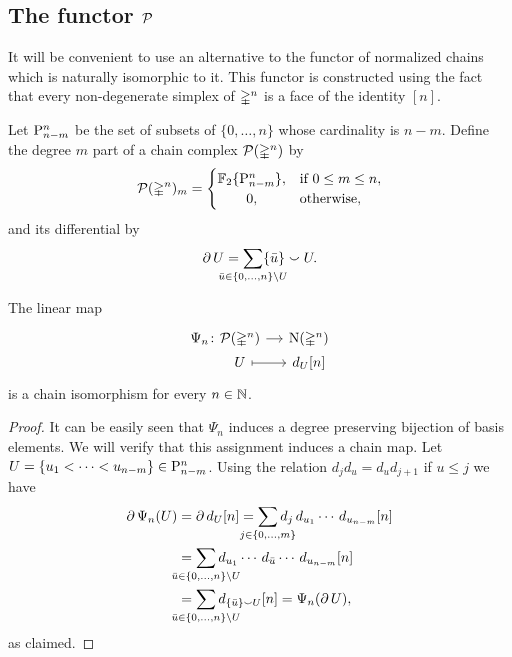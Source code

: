 \subsection{The functor $\cP$}

It will be convenient to use an alternative to the functor of normalized chains which is naturally isomorphic to it.
This functor is constructed using the fact that every non-degenerate simplex of $\simplex^n$ is a face of the identity $[n]$.

\begin{definition} \label{d:dual chains}
	Let $\P_{n-m}^n$ be the set of subsets of $\{0, \dots, n\}$ whose cardinality is $n-m$.
	Define the degree $m$ part of a chain complex $\cP(\simplex^n)$ by
	\[
	\cP(\simplex^n)_m = \begin{cases}
	\F\{\P_{n-m}^n\}, & \text{if } 0 \leq m \leq n, \\
	\hfil 0, & \text{otherwise},
	\end{cases}
	\]
	and its differential by
	\begin{equation} \label{e:boundary of P}
	\bd U =
	\sum_{\mathclap{\bar u \in \{0, \dots, n\} \setminus U}} \{\bar u\} \union U.
	\end{equation}
\end{definition}

\begin{lemma}
	The linear map
	\[
	\begin{tikzcd} [column sep=small, row sep=0]
	\Psi_n \colon &[-20pt] \cP(\simplex^n) \arrow[r] & \chains(\simplex^n) \\
	& U \arrow[r, mapsto] & d_U [n]
	\end{tikzcd}
	\]
	is a chain isomorphism for every $n \in \N$.
\end{lemma}

\begin{proof}
	It can be easily seen that $\Psi_n$ induces a degree preserving bijection of basis elements.
	We will verify that this assignment induces a chain map.
	Let $U = \{u_1 < \cdots < u_{n-m}\} \in \rP_{n-m}^n$.
	Using the relation $d_jd_u = d_ud_{j+1}$ if $u \leq j$ we have
	\begin{align*}
	\bd \Psi_n(U) &=
	\bd d_U[n] =
	\sum_{\mathclap{j \in \{0, \dots, m\}}}
	d_j\, d_{u_1} \cdots\, d_{u_{n-m}}[n] \\ &=
	\sum_{\mathclap{\bar u \in \{0, \dots, n\} \setminus U}}
	d_{u_1} \cdots\, d_{\bar{u}} \cdots\, d_{u_{n-m}}[n] \\ &=
	\sum_{\mathclap{\bar u \in \{0, \dots, n\} \setminus U}}
	d_{\{\bar u\} \union U}[n] =
	\Psi_n(\bd U),
	\end{align*}
	as claimed.
\end{proof}


